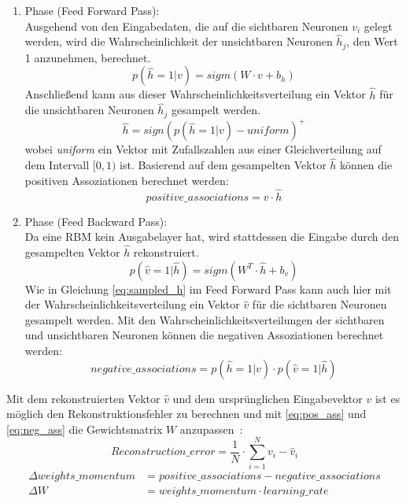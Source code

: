 \begin{enumerate}
\item Phase (Feed Forward Pass):\\
Ausgehend von den Eingabedaten, die auf die sichtbaren Neuronen $v_i$ gelegt werden, wird die Wahrscheinlichkeit der unsichtbaren Neuronen $\hat{h}_j$, den Wert 1 anzunehmen, berechnet.
\begin{equation}
    p(\hat{h}=1|v) = sigm(W\cdot v + b_{h})
\end{equation}
Anschließend kann aus dieser Wahrscheinlichkeitsverteilung ein Vektor $\hat{h}$ für die unsichtbaren Neuronen $\hat{h}_j$ gesampelt werden.
\begin{equation}
\label{eq:sampled_h}
    \hat{h} = sign(p(\hat{h}=1|v) - uniform)^+
\end{equation}
wobei \emph{uniform} ein Vektor mit Zufallszahlen aus einer Gleichverteilung auf dem Intervall $[0,1)$ ist. Basierend auf dem gesampelten Vektor $\hat{h}$ können die positiven Assoziationen berechnet werden:
\begin{equation}
\label{eq:pos_ass}
    positive\_associations = v \cdot \hat{h}
\end{equation}
\item Phase (Feed Backward Pass):\\
Da eine RBM kein Ausgabelayer hat, wird stattdessen die Eingabe durch den gesampelten Vektor $\hat{h}$ rekonstruiert.
\begin{equation}
    p(\hat{v}=1|\hat{h}) = sigm(W^T\cdot\hat{h} + b_{v})
\end{equation}
Wie in Gleichung \ref{eq:sampled_h} im Feed Forward Pass kann auch hier mit der Wahrscheinlichkeitsverteilung ein Vektor $\hat{v}$ für die sichtbaren Neuronen gesampelt werden.
Mit den Wahrscheinlichkeitsverteilungen der sichtbaren und unsichtbaren Neuronen können die negativen Assoziationen berechnet werden:
\begin{equation}
\label{eq:neg_ass}
    negative\_associations = p(\hat{h}=1|v)\cdot p(\hat{v}=1|\hat{h})
\end{equation}
\end{enumerate}

\noindent Mit dem rekonstruierten Vektor $\hat{v}$ und dem ursprünglichen Eingabevektor $v$ ist es möglich den Rekonstruktionsfehler zu  berechnen und mit \ref{eq:pos_ass} und \ref{eq:neg_ass} die Gewichtsmatrix $W$ anzupassen~\cite{hinton2012practical}:
\begin{equation}
    Reconstruction\_error = \frac{1}{N} \cdot \sum^N_{i=1}v_i - \hat{v}_i
\end{equation}
\begin{equation}
\label{eq:weight}
    \begin{split}
        \Delta weights\_momentum &= positive\_associations - negative\_associations\\
        \Delta W &= weights\_momentum \cdot learning\_rate
    \end{split}
\end{equation}

